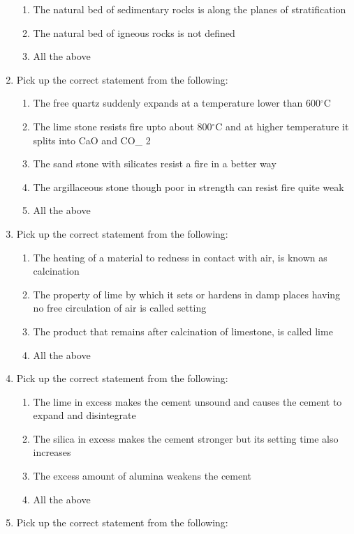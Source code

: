 \documentclass[11pt,a4paper]{article}
\begin{document}
\begin{enumerate}
\begin{enumerate}[label=\Alph*.]
\item{The natural bed of sedimentary rocks is along the planes of stratification}
\item{The natural bed of igneous rocks is not defined}
\item{All the above}
\end{enumerate}
\item{Pick up the correct statement from the following:}
\begin{enumerate}[label=\Alph*.]
\item{The free quartz suddenly expands at a temperature lower than 600$^\circ$C}
\item{The lime stone resists fire upto about 800$^\circ$C and at higher temperature it splits into CaO and CO\_ 2}
\item{The sand stone with silicates resist a fire in a better way}
\item{The argillaceous stone though poor in strength can resist fire quite weak}
\item{All the above}
\end{enumerate}
\item{Pick up the correct statement from the following:}
\begin{enumerate}[label=\Alph*.]
\item{The heating of a material to redness in contact with air, is known as calcination}
\item{The property of lime by which it sets or hardens in damp places having no free circulation of air is called setting}
\item{The product that remains after calcination of limestone, is called lime}
\item{All the above}
\end{enumerate}
\item{Pick up the correct statement from the following:}
\begin{enumerate}[label=\Alph*.]
\item{The lime in excess makes the cement unsound and causes the cement to expand and disintegrate}
\item{The silica in excess makes the cement stronger but its setting time also increases}
\item{The excess amount of alumina weakens the cement}
\item{All the above}
\end{enumerate}
\item{Pick up the correct statement from the following:}
\begin{enumerate}[label=\Alph*.]

\end{enumerate}
\end{enumerate}
\end{document}
